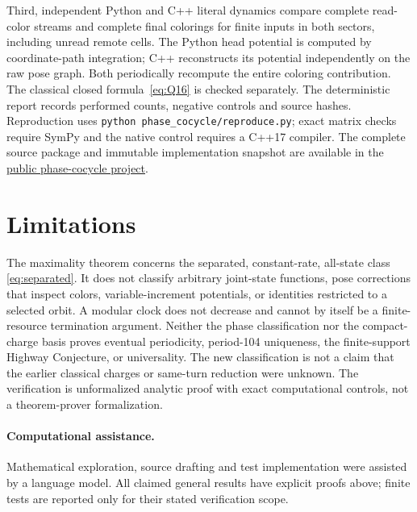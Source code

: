 \documentclass[11pt]{article}
\theoremstyle{definition}
\begin{document}
Third, independent Python and C++ literal dynamics compare complete read-color
streams and complete final colorings for finite inputs in both sectors, including
unread remote cells. The Python head potential is computed by coordinate-path
integration; C++ reconstructs its potential independently on the raw pose graph.
Both periodically recompute the entire coloring contribution. The classical
closed formula~\eqref{eq:Q16} is checked separately. The deterministic report
records performed counts, negative controls and source hashes. Reproduction uses
\texttt{python phase\_cocycle/reproduce.py}; exact matrix checks require
SymPy and the native control requires a C++17 compiler. The complete source
package and immutable implementation snapshot are available in the
\href{https://github.com/kehao95/langtons-ant-core/tree/3ae4ce12abf6ad44a5c7625b31d25e6f1365ffa3/phase_cocycle}{public phase-cocycle project}.

\section{Limitations}
The maximality theorem concerns the separated, constant-rate, all-state class
\eqref{eq:separated}. It does not classify arbitrary joint-state functions,
pose corrections that inspect colors, variable-increment potentials, or
identities restricted to a selected orbit. A modular clock does not decrease
and cannot by itself be a finite-resource termination argument. Neither the
phase classification nor the compact-charge basis proves eventual periodicity,
period-104 uniqueness, the finite-support Highway Conjecture, or universality.
The new classification is not a claim that the earlier classical charges or
same-turn reduction were unknown. The verification is unformalized analytic
proof with exact computational controls, not a theorem-prover formalization.

\paragraph{Computational assistance.}
Mathematical exploration, source drafting and test implementation were assisted
by a language model. All claimed general results have explicit proofs above;
finite tests are reported only for their stated verification scope.
\end{document}
